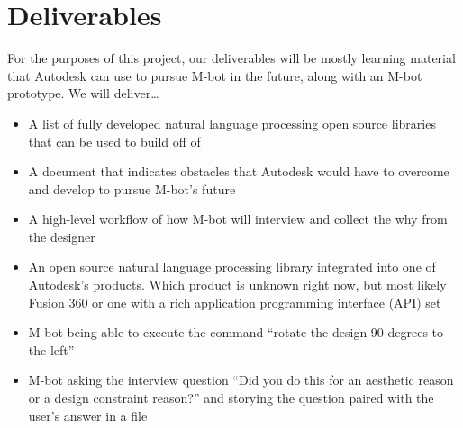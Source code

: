 \documentclass[onecolumn, draftclsnofoot,10pt, compsoc]{IEEEtran}
\begin{document}
\section{Deliverables}
For the purposes of this project, our deliverables will be mostly learning material that Autodesk can use to pursue M-bot in the future, along with an M-bot prototype. We will deliver\dots
\begin{itemize}
	\item A list of fully developed natural language processing open source libraries that can be used to build off of
	\item A document that indicates obstacles that Autodesk would have to overcome and develop to pursue M-bot’s future
	\item A high-level workflow of how M-bot will interview and collect the why from the designer
	\item An open source natural language processing library integrated into one of Autodesk’s products. Which product is unknown right now, but most likely Fusion 360 or one with a rich application programming interface (API) set
	\item M-bot being able to execute the command “rotate the design 90 degrees to the left”
	\item M-bot asking the interview question “Did you do this for an aesthetic reason or a design constraint reason?” and storying the question paired with the user’s answer in a file
\end{itemize}

 

\end{document}
